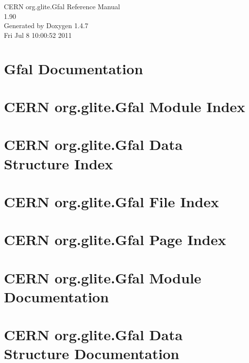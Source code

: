 \documentclass[a4paper]{book}
\begin{document}
\begin{titlepage}
\vspace*{7cm}
\begin{center}
{\Large CERN org.glite.Gfal Reference Manual\\[1ex]\large 1.90 }\\
\vspace*{1cm}
{\large Generated by Doxygen 1.4.7}\\
\vspace*{0.5cm}
{\small Fri Jul 8 10:00:52 2011}\\
\end{center}
\end{titlepage}
\clearemptydoublepage
{}
\tableofcontents
\clearemptydoublepage
{}
\chapter{Gfal Documentation }
\label{index}
\chapter{CERN org.glite.Gfal Module Index}

\chapter{CERN org.glite.Gfal Data Structure Index}

\chapter{CERN org.glite.Gfal File Index}

\chapter{CERN org.glite.Gfal Page Index}

\chapter{CERN org.glite.Gfal Module Documentation}





\chapter{CERN org.glite.Gfal Data Structure Documentation}





\end{document}
